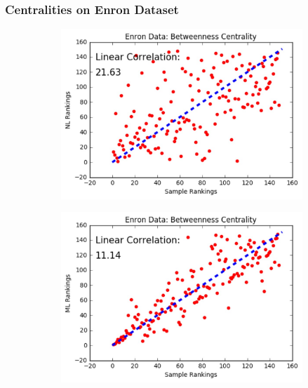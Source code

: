 \documentclass[10pt]{beamer}
\begin{document}
\begin{frame}
\frametitle{Centralities on Enron Dataset}
\vspace{0.15in}
\begin{figure}[H]
\centering
\begin{subfigure}{.32\textwidth}
  \centering
  \includegraphics[width=0.95\linewidth]{EBC_NL.jpeg}
\end{subfigure}
\begin{subfigure}{.32\textwidth}
	\centering
    \includegraphics[width=0.95\linewidth]{EBC_ML.jpeg}
\end{subfigure}
\begin{subfigure}{.32\textwidth}
	\centering

\end{subfigure}
\end{figure}
\end{frame}
\end{document}
